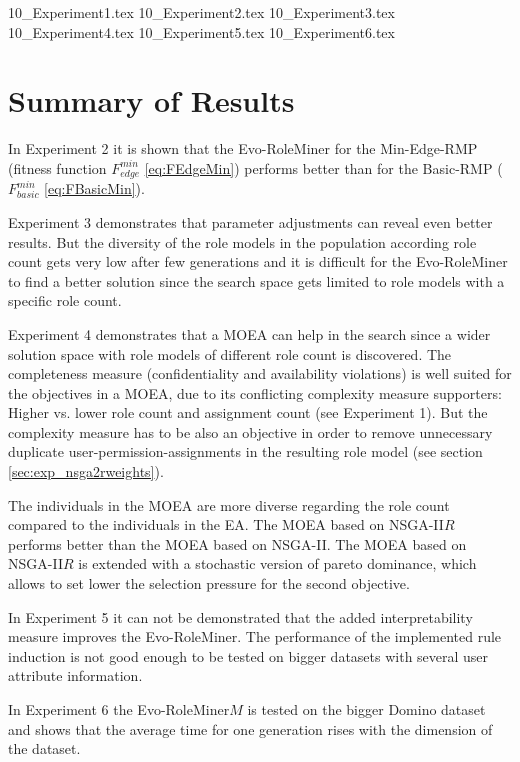 {10_Experiment1.tex}
{10_Experiment2.tex}
{10_Experiment3.tex}
{10_Experiment4.tex}
{10_Experiment5.tex}
{10_Experiment6.tex}

\section{Summary of Results}
In Experiment 2 it is shown that the Evo-RoleMiner for the Min-Edge-RMP (fitness function $F_{edge}^{min}$ \eqref{eq:FEdgeMin}) performs better than for the Basic-RMP ($F_{basic}^{min}$ \eqref{eq:FBasicMin}).

Experiment 3 demonstrates that parameter adjustments can reveal even better results. But the diversity of the role models in the population according role count gets very low after few generations and it is difficult for the Evo-RoleMiner to find a better solution since the search space gets limited to role models with a specific role count.

Experiment 4 demonstrates that a MOEA can help in the search since a wider solution space with role models of different role count is discovered. The completeness measure (confidentiality and availability violations) is well suited for the objectives in a MOEA, due to its conflicting complexity measure supporters: Higher vs. lower role count and assignment count (see Experiment 1). But the complexity measure has to be also an objective in order to remove unnecessary duplicate user-permission-assignments in the resulting role model (see section \ref{sec:exp_nsga2rweights}).

The individuals in the MOEA are more diverse regarding the role count compared to the individuals in the EA. The MOEA based on NSGA-II$R$\cite{Fortin:2013} performs better than the MOEA based on NSGA-II\cite{Deb:2002}. The MOEA based on NSGA-II$R$ is extended with a stochastic version of pareto dominance, which allows to set lower the selection pressure for the second objective\cite{clune2013evolutionary}.

In Experiment 5 it can not be demonstrated that the added interpretability measure improves the Evo-RoleMiner. The performance of the implemented rule induction is not good enough to be tested on bigger datasets with several user attribute information.

In Experiment 6 the Evo-RoleMiner$M$ is tested on the bigger Domino dataset and shows that the average time for one generation rises with the dimension of the dataset.